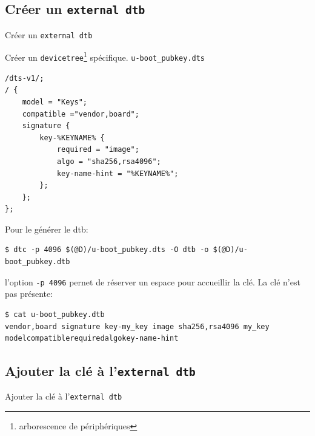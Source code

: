 \documentclass[aspectratio=169]{beamer}
\begin{document}

\subsection{Créer un \texttt{external dtb}}

\begin{frame}
\begin{center}
\large{Créer un \texttt{external dtb}}
\end{center}
\end{frame}

\begin{frame}[fragile]
Créer un \texttt{devicetree}\footnote{arborescence de périphériques} spécifique.
\texttt{u-boot\_pubkey.dts}
\begin{lstlisting}
/dts-v1/;
/ {
	model = "Keys";
	compatible ="vendor,board";
	signature {
		key-%KEYNAME% {
			required = "image";
			algo = "sha256,rsa4096";
			key-name-hint = "%KEYNAME%";
		};
	};
};
\end{lstlisting}
\end{frame}

\begin{frame}[fragile]
Pour le générer le dtb:
\begin{lstlisting}[style=shell]
$ dtc -p 4096 $(@D)/u-boot_pubkey.dts -O dtb -o $(@D)/u-boot_pubkey.dtb
\end{lstlisting}
l'option \texttt{-p 4096} pernet de réserver un espace pour accueillir la clé.\newline
\newline
La clé n'est pas présente:
\begin{lstlisting}[style=shell]
$ cat u-boot_pubkey.dtb
vendor,board signature key-my_key image sha256,rsa4096 my_key modelcompatiblerequiredalgokey-name-hint
\end{lstlisting}
\end{frame}


\subsection{Ajouter la clé à l'\texttt{external dtb}}

\begin{frame}
\begin{center}
\large{Ajouter la clé à l'\texttt{external dtb}}
\end{center}
\end{frame}
\end{document}
